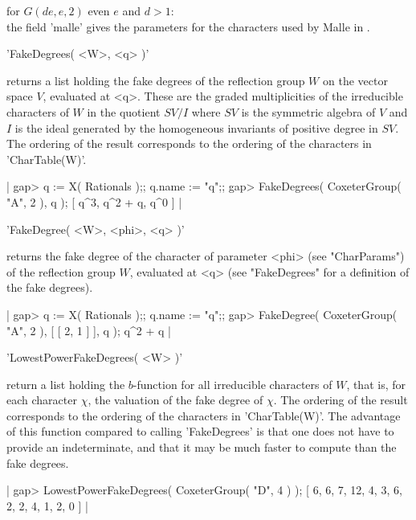 for $G(de,e,2)$ even $e$ and $d>1$:\\ the field 'malle' gives the parameters
  for the characters used by Malle in \cite{Mal96}.

'FakeDegrees( <W>, <q> )'

returns  a list holding the fake degrees of the reflection group $W$ on the
vector  space $V$, evaluated at <q>. These are the graded multiplicities of
the  irreducible characters of $W$ in the quotient $SV/I$ where $SV$ is the
symmetric  algebra of $V$ and $I$ is the ideal generated by the homogeneous
invariants  of  positive  degree  in  $SV$.  The  ordering  of  the  result
corresponds to the ordering of the characters in 'CharTable(W)'.

|    gap> q := X( Rationals );; q.name := "q";;
    gap> FakeDegrees( CoxeterGroup( "A", 2 ), q );
    [ q^3, q^2 + q, q^0 ] |


'FakeDegree( <W>, <phi>, <q> )'

returns  the  fake degree  of  the  character  of parameter  <phi>  (see
"CharParams")  of  the  reflection  group $W$,  evaluated  at  <q>  (see
"FakeDegrees" for a definition of the fake degrees).

|    gap> q := X( Rationals );; q.name := "q";;
    gap> FakeDegree( CoxeterGroup( "A", 2 ), [ [ 2, 1 ] ], q );
    q^2 + q |


'LowestPowerFakeDegrees( <W> )'

return a list holding the $b$-function for all irreducible characters of
$W$,  that is,  for each  character $\chi$,  the valuation  of the  fake
degree of $\chi$. The ordering of the result corresponds to the ordering
of  the characters  in 'CharTable(W)'.  The advantage  of this  function
compared to calling  'FakeDegrees' is that one does not  have to provide
an indeterminate,  and that it  may be much  faster to compute  than the
fake degrees.

|    gap> LowestPowerFakeDegrees( CoxeterGroup( "D", 4 ) );
    [ 6, 6, 7, 12, 4, 3, 6, 2, 2, 4, 1, 2, 0 ] |


